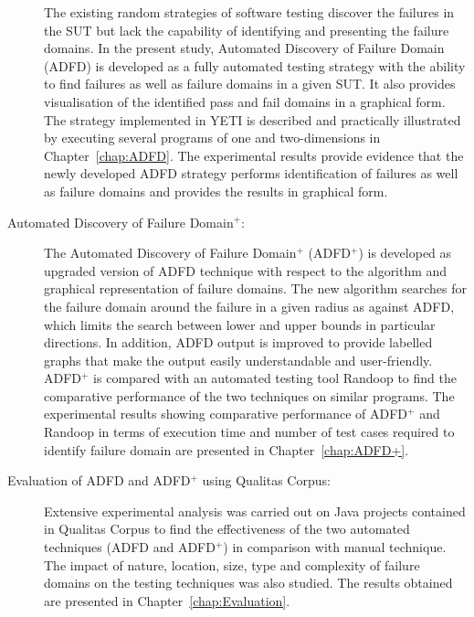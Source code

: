\begin{description}
The existing random strategies of software testing discover the failures in the SUT but lack the capability of identifying and presenting the failure domains. In the present study, Automated Discovery of Failure Domain (ADFD) is developed as a fully automated testing strategy with the ability to find failures as well as failure domains in a given SUT. It also provides visualisation of the identified pass and fail domains in a graphical form. The strategy implemented in YETI is described and practically illustrated by executing several programs of one and two-dimensions in Chapter~\ref{chap:ADFD}. The experimental results provide evidence that the newly developed ADFD strategy performs identification of failures as well as failure domains and provides the results in graphical form.\\

\item[Automated Discovery of Failure Domain$^+$:]

The Automated Discovery of Failure Domain$^+$ (ADFD$^+$) is developed as upgraded version of ADFD technique with respect to the algorithm and graphical representation of failure domains. The new algorithm searches for the failure domain around the failure in a given radius as against ADFD, which limits the search between lower and upper bounds in particular directions. In addition, ADFD output is improved to provide labelled graphs that make the output easily understandable and user-friendly. ADFD$^+$ is compared with an automated testing tool Randoop to find the comparative performance of the two techniques on similar programs. 
The experimental results showing comparative performance of ADFD$^+$ and Randoop in terms of execution time and number of test cases required to identify failure domain are presented in Chapter~\ref{chap:ADFD+}.\\






\item[Evaluation of ADFD and ADFD$^+$ using Qualitas Corpus:]

Extensive experimental analysis was carried out on Java projects contained in Qualitas Corpus to find the effectiveness of the two automated techniques (ADFD and ADFD$^+$) in comparison with manual technique. The impact of nature, location, size, type and complexity of failure domains on the testing techniques was also studied. The results obtained are presented in Chapter~\ref{chap:Evaluation}.\\


\end{description}
